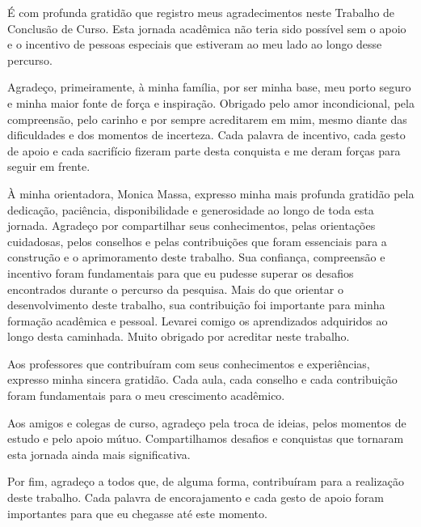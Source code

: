 É com profunda gratidão que registro meus agradecimentos neste Trabalho de Conclusão de Curso. Esta jornada acadêmica não teria sido possível sem o apoio e o incentivo de pessoas especiais que estiveram ao meu lado ao longo desse percurso.

Agradeço, primeiramente, à minha família, por ser minha base, meu porto seguro e minha maior fonte de força e inspiração. Obrigado pelo amor incondicional, pela compreensão, pelo carinho e por sempre acreditarem em mim, mesmo diante das dificuldades e dos momentos de incerteza. Cada palavra de incentivo, cada gesto de apoio e cada sacrifício fizeram parte desta conquista e me deram forças para seguir em frente.

À minha orientadora, Monica Massa, expresso minha mais profunda gratidão pela dedicação, paciência, disponibilidade e generosidade ao longo de toda esta jornada. Agradeço por compartilhar seus conhecimentos, pelas orientações cuidadosas, pelos conselhos e pelas contribuições que foram essenciais para a construção e o aprimoramento deste trabalho. Sua confiança, compreensão e incentivo foram fundamentais para que eu pudesse superar os desafios encontrados durante o percurso da pesquisa. Mais do que orientar o desenvolvimento deste trabalho, sua contribuição foi importante para minha formação acadêmica e pessoal. Levarei comigo os aprendizados adquiridos ao longo desta caminhada. Muito obrigado por acreditar neste trabalho.

Aos professores que contribuíram com seus conhecimentos e experiências, expresso minha sincera gratidão. Cada aula, cada conselho e cada contribuição foram fundamentais para o meu crescimento acadêmico.

Aos amigos e colegas de curso, agradeço pela troca de ideias, pelos momentos de estudo e pelo apoio mútuo. Compartilhamos desafios e conquistas que tornaram esta jornada ainda mais significativa.

Por fim, agradeço a todos que, de alguma forma, contribuíram para a realização deste trabalho. Cada palavra de encorajamento e cada gesto de apoio foram importantes para que eu chegasse até este momento.